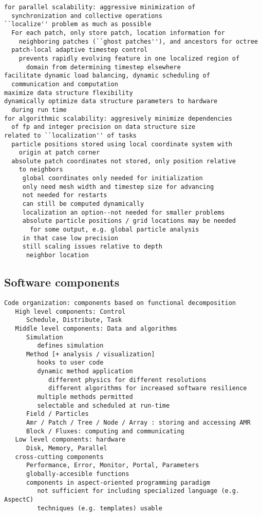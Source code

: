\documentclass[14pt,letter]{article}
\begin{document}
\begin{verbatim}
for parallel scalability: aggressive minimization of
  synchronization and collective operations
``localize'' problem as much as possible
  For each patch, only store patch, location information for
    neighboring patches (``ghost patches''), and ancestors for octree
  patch-local adaptive timestep control
    prevents rapidly evolving feature in one localized region of
      domain from determining timestep elsewhere
facilitate dynamic load balancing, dynamic scheduling of
  communication and computation
maximize data structure flexibility
dynamically optimize data structure parameters to hardware
  during run time
for algorithmic scalability: aggresively minimize dependencies
  of fp and integer precision on data structure size
related to ``localization'' of tasks
  particle positions stored using local coordinate system with
    origin at patch corner
  absolute patch coordinates not stored, only position relative
    to neighbors
     global coordinates only needed for initialization
     only need mesh width and timestep size for advancing
     not needed for restarts
     can still be computed dynamically
     localization an option--not needed for smaller problems
     absolute particle positions / grid locations may be needed
       for some output, e.g. global particle analysis
     in that case low precision
     still scaling issues relative to depth
      neighbor location
\end{verbatim}

\subsection{Software components} \label{ss:components}

\begin{verbatim}
Code organization: components based on functional decomposition
   High level components: Control
      Schedule, Distribute, Task
   Middle level components: Data and algorithms
      Simulation
         defines simulation
      Method [+ analysis / visualization]
         hooks to user code
         dynamic method application
            different physics for different resolutions
            different algorithms for increased software resilience
         multiple methods permitted
         selectable and scheduled at run-time
      Field / Particles 
      Amr / Patch / Tree / Node / Array : storing and accessing AMR
      Block / Fluxes: computing and communicating
   Low level components: hardware 
      Disk, Memory, Parallel      
   cross-cutting components
      Performance, Error, Monitor, Portal, Parameters
      globally-accesible functions
      components in aspect-oriented programming paradigm
         not sufficient for including specialized language (e.g. AspectC)
         techniques (e.g. templates) usable
\end{verbatim}
\end{document}
